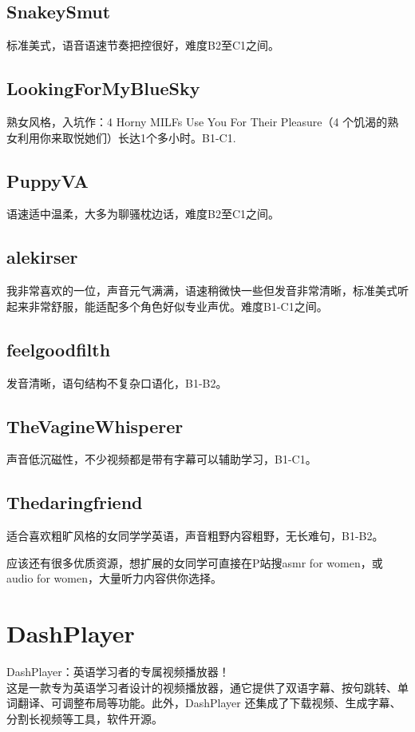 \documentclass[11pt]{article}
\begin{document}
\subsection{SnakeySmut}
\label{sec:orgdad3761}
标准美式，语音语速节奏把控很好，难度B2至C1之间。

\subsection{LookingForMyBlueSky}
\label{sec:org30ff03c}
熟女风格，入坑作：4 Horny MILFs Use You For Their Pleasure（4 个饥渴的熟女利用你来取悦她们）长达1个多小时。B1-C1.

\subsection{PuppyVA}
\label{sec:orge10f7a4}
语速适中温柔，大多为聊骚枕边话，难度B2至C1之间。

\subsection{alekirser}
\label{sec:orgb243705}
我非常喜欢的一位，声音元气满满，语速稍微快一些但发音非常清晰，标准美式听起来非常舒服，能适配多个角色好似专业声优。难度B1-C1之间。

\subsection{feelgoodfilth}
\label{sec:orge498292}
发音清晰，语句结构不复杂口语化，B1-B2。

\subsection{TheVagineWhisperer}
\label{sec:org11b9492}
声音低沉磁性，不少视频都是带有字幕可以辅助学习，B1-C1。

\subsection{Thedaringfriend}
\label{sec:org049a8ce}
适合喜欢粗旷风格的女同学学英语，声音粗野内容粗野，无长难句，B1-B2。

应该还有很多优质资源，想扩展的女同学可直接在P站搜asmr for women，或audio for women，大量听力内容供你选择。

\section{DashPlayer}
\label{sec:org7d9bc10}
DashPlayer：英语学习者的专属视频播放器！\\
这是一款专为英语学习者设计的视频播放器，通它提供了双语字幕、按句跳转、单词翻译、可调整布局等功能。此外，DashPlayer 还集成了下载视频、生成字幕、分割长视频等工具，软件开源。
\end{document}
